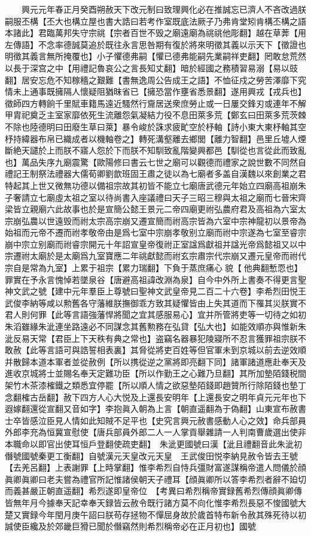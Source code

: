 　　興元元年春正月癸酉朔赦天下改元制曰致理興化必在推誠忘已濟人不吝改過朕嗣服丕構【丕大也構立屋也書大誥曰若考作室既底法厥子乃弗肯堂矧肯構丕構之語本諸此】君臨萬邦失守宗祧【宗者百世不毁之廟遠廟為祧祧他彫翻】越在草莾【用左傳語】不念率德誠莫追於既往永言思咎期有復於將來明徵其義以示天下【徵證也明徵其義言無所掩覆也】小子懼德弗嗣【懼已德弗能嗣先業嗣祥吏翻】罔敢怠荒然以長于深宫之中【用禮記魯哀公之言長知丈翻】暗於經國之務積習易溺【易以豉翻】居安忘危不知稼穡之艱難【書無逸周公告成王之語】不恤征戍之勞苦澤靡下究情未上通事既擁隔人懷疑阻猶昩省已【擁恐當作壅省悉景翻】遂用興戎【戎兵也】徵師四方轉餉千里賦車籍馬遠近騷然行齎居送衆庶勞止或一日屢交鋒刃或連年不解甲胄祀奠乏主室家靡依死生流離怨氣凝結力役不息田萊多荒【鄭玄曰田萊多荒茨棘不除也陸德明曰田廢生草曰萊】暴令峻於誅求疲甿空於杼軸【詩小東大東杼軸其空杼持緯器布帛已織成者以機軸卷之】轉死溝壑離去鄉閭【離力智翻】邑里丘墟人煙斷絶天譴於上而朕不寤人怨於下而朕不知馴致亂階變興都邑【馴從也言從此而致亂也】萬品失序九廟震驚【歐陽修曰書云七世之廟可以觀德而禮家之說世數不同然自禮記王制祭法禮器大儒荀卿劉歆班固王肅之徒以為七廟者多盖自漢魏以來創業之君特起其上世又微無功德以備祖宗故其初皆不能立七廟唐武德元年始立四廟高祖崩朱子奢請立七廟虛太祖之室以待尚書入座議禮曰天子三昭三穆與太祖之廟而七晉宋齊梁皆立親廟六此故事也於是宣簡公懿王景元二帝四廟更祔弘農府君及高祖為六室太宗崩弘農以世遠毁而祔太宗高宗崩又遷宣簡而祔高宗皆為六室中宗神龍初以景帝為始祖而元帝不遷而祔孝敬帝由是爲七室中宗崩孝敬别立廟而祔中宗遂為七室至睿宗崩中宗立别廟而祔睿宗開元十年詔宣皇帝復祔正室諡爲獻祖并諡光帝爲懿祖又以中宗遷祔太廟於是太廟爲九室寶應二年祧獻懿而祔玄宗肅宗代宗崩又遷元皇帝而祔代宗自是常為九室】上累于祖宗【累力瑞翻】下負于蒸庶痛心貌【他典翻慙恧也】罪實在予永言愧悼若墜泉谷【唐避高祖諱改淵為泉】自今中外所上書奏不得更言聖神文武之號【建中元年羣臣上尊號曰聖神文武皇帝見二百二十六卷】李希烈田悦王武俊李納等咸以勲舊各守藩維朕撫御乖方致其疑懼皆由上失其道而下罹其災朕實不君人則何罪【此等言語強藩悍將聞之宜其感服易心】宜并所管將吏等一切待之如初朱滔雖緣朱泚連坐路遠必不同謀念其舊勲務在弘貸【弘大也】如能效順亦與惟新朱泚反易天常【君臣上下天秩有典之常也】盗竊名器暴犯陵寢所不忍言獲罪祖宗朕不敢赦【此等言語可與誥誓相表裏】其脅從將吏百姓等但官軍未到京城以前去逆效順并散歸本道本軍者並從赦例【所以携從逆之黨將即亮翻下同】諸軍諸道應赴奉天及進收京城將士並賜名奉天定難功臣【所以作勤王之心難乃旦翻】其所加墊陌錢税間架竹木茶漆榷鐵之類悉宜停罷【所以順人情之欲惡墊陌錢即趙贊所行除陌錢也墊丁念翻榷古岳翻】赦下四方人心大悦及上還長安明年【上還長安之明年貞元元年也下遐嫁翻還從宣翻又音如字】李抱眞入朝為上言【朝直遥翻為于偽翻】山東宣布赦書士卒皆感泣臣見人情如此知賊不足平也【史究言興元赦書感動人心之效】命兵部員外郎李充為恒冀宣慰使【唐兵部員外郎二人一人掌貢舉雜請一人判南曹歲選出使非本職命以即官出使耳恒戶登翻使疏吏翻】　朱泚更國號曰漢【泚且禮翻音此朱泚初僭號國號秦更工衡翻】自號漢元天皇改元天皇　王武俊田悦李納見赦令皆去王號【去羌呂翻】上表謝罪【上時掌翻】惟李希烈自恃兵彊財富遂謀稱帝遣人問儀於顔眞卿眞卿曰老夫嘗為禮官所記惟諸侯朝天子禮耳【顔眞卿所以答李希烈者辭不廹切而義甚嚴正朝直遥翻】希烈遂即皇帝位　【考異曰希烈稱帝實録舊希烈傳顔眞卿傳皆無年月今據奉天記幸奉天録皆云赦令既行諸方莫不向化惟李希烈長惡不悛國號大楚又實録今年閏月庚午詔曰朕苟存拯物不憚屈身故於歲首特布新令赦其殊死待以初誠使臣纔及於郊畿巨猾已聞於僭竊然則希烈稱帝必在正月初也】國號